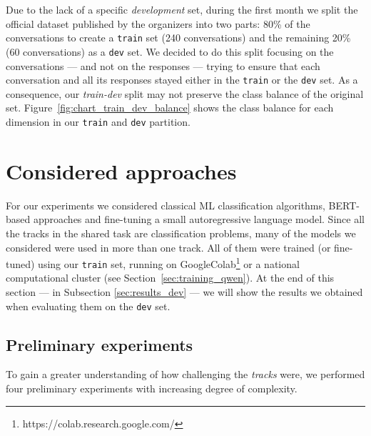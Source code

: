 \documentclass[11pt]{article}
\begin{document}
Due to the lack of a specific \textit{development} set, during the first month we split the official dataset published by the organizers into two parts: 80\% of the conversations to create a \texttt{train} set (240 conversations) and the remaining 20\% (60 conversations) as a \texttt{dev} set. 
We decided to do this split focusing on the conversations --- and not on the responses --- trying to ensure that each conversation and all its responses stayed either in the \texttt{train} or the \texttt{dev} set. 
As a consequence, our \textit{train-dev} split may not preserve the class balance of the original set.
Figure~\ref{fig:chart_train_dev_balance} shows the class balance for each dimension in our \texttt{train} and \texttt{dev} partition. 




\section{Considered approaches}
\label{sec:approaches}

For our experiments we considered classical ML classification algorithms, BERT-based approaches and fine-tuning a small autoregressive language model.
Since all the tracks in the shared task are classification problems, many of the models we considered were used in more than one track.
All of them were trained (or fine-tuned) using our \texttt{train} set, running on GoogleColab\footnote{https://colab.research.google.com/} or a national computational cluster (see Section~\ref{sec:training_qwen}). 
At the end of this section --- in Subsection \ref{sec:results_dev} --- we will show the results we obtained when evaluating them on the \texttt{dev} set.


\subsection{Preliminary experiments}

To gain a greater understanding of how challenging the \textit{tracks} were, we performed four preliminary experiments with increasing degree of complexity.
\end{document}
